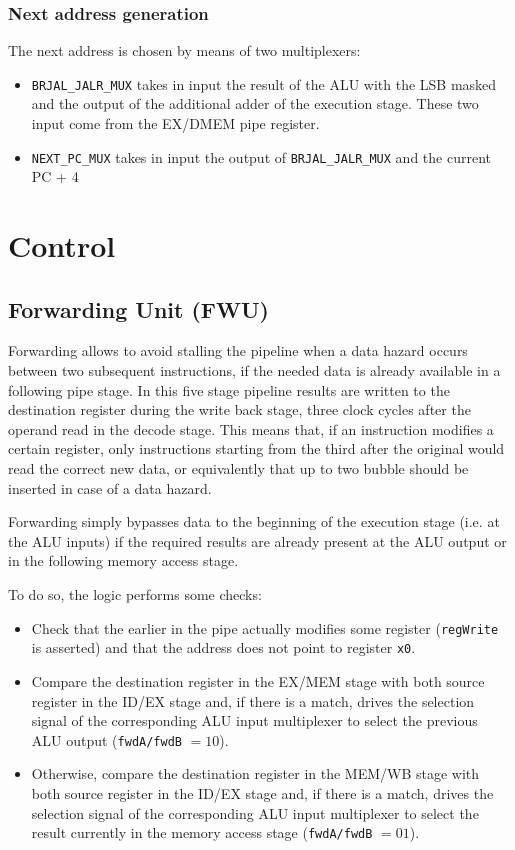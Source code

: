\documentclass[a4paper]{article}
\begin{document}
\subsubsection{Next address generation}
The next address is chosen by means of two multiplexers:
\begin{itemize}
    \item \texttt{BRJAL\_JALR\_MUX} takes in input the result of the ALU with the LSB masked and the output of the additional adder of the execution stage. These two input come from the EX/DMEM pipe register.
    \item \texttt{NEXT\_PC\_MUX} takes in input the output of \texttt{BRJAL\_JALR\_MUX} and the current PC + 4
\end{itemize}

\section{Control}
\subsection{Forwarding Unit (FWU)}
Forwarding allows to avoid stalling the pipeline when a data hazard occurs between two subsequent instructions, if the needed data is already available in a following pipe stage. 
In this five stage pipeline results are written to the destination register during the write back stage, three clock cycles after the operand read in the decode stage. This means that, if an instruction modifies a certain register, only instructions starting from the third after the original would read the correct new data, or equivalently that up to two bubble should be inserted in case of a data hazard.

Forwarding simply bypasses data to the beginning of the execution stage (i.e. at the ALU inputs) if the required results are already present at the ALU output or in the following memory access stage. 

To do so, the logic performs some checks:
\begin{itemize}
    \item Check that the earlier in the pipe actually modifies some register (\texttt{regWrite} is asserted) and that the address does not point to register \texttt{x0}.
    \item Compare the destination register in the EX/MEM stage with both source register in the ID/EX stage and, if there is a match, drives the selection signal of the corresponding ALU input multiplexer to select the previous ALU output (\texttt{fwdA/fwdB} $= 10$).
    \item Otherwise, compare the destination register in the MEM/WB stage with both source register in the ID/EX stage and, if there is a match, drives the selection signal of the corresponding ALU input multiplexer to select the result currently in the memory access stage (\texttt{fwdA/fwdB} $= 01$).
\end{itemize}
\end{document}
